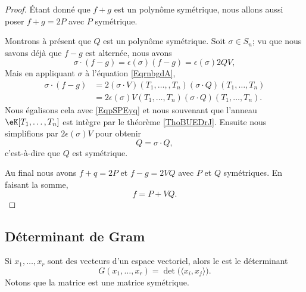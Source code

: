 \begin{proof}
	Étant donné que \( f+g\) est un polynôme symétrique, nous allons aussi poser \( f+g=2P\) avec \( P\) symétrique.

	Montrons à présent que \( Q\) est un polynôme symétrique. Soit \( \sigma\in S_n\); vu que nous savons déjà que \( f-g\) est alternée, nous avons
	\begin{equation}    \label{EqpSPEyq}
		\sigma\cdot (f-g)=\epsilon(\sigma)(f-g)=\epsilon(\sigma)2QV,
	\end{equation}
	Mais en appliquant \( \sigma\) à l'équation \eqref{EqrnbgdA},
	\begin{subequations}
		\begin{align}
			\sigma\cdot (f-g) & =2(\sigma\cdot V)(T_1,\ldots, ,T_n)(\sigma\cdot Q)(T_1,\ldots,T_n)    \\
			                  & =2\epsilon(\sigma)V(T_1,\ldots, T_n)(\sigma\cdot Q)(T_1,\ldots, T_n).
		\end{align}
	\end{subequations}
	Nous égalisons cela avec \eqref{EqpSPEyq} et nous souvenant que l'anneau \( \eK[T_1,\ldots, T_n]\) est intègre par le théorème \ref{ThoBUEDrJ}. Ensuite nous simplifions par \( 2\epsilon(\sigma)V\) pour obtenir
	\begin{equation}
		Q=\sigma\cdot Q,
	\end{equation}
	c'est-à-dire que \( Q\) est symétrique.

	Au final nous avons \( f+q=2P\) et \( f-g=2VQ\) avec \( P\) et \( Q\) symétriques. En faisant la somme,
	\begin{equation}
		f=P+VQ.
	\end{equation}
\end{proof}

\subsection{Déterminant de Gram}

Si \( x_1,\ldots, x_r\) sont des vecteurs d'un espace vectoriel, alors le  est le déterminant
\begin{equation}
	G(x_1,\ldots, x_r)=\det\big( \langle x_i, x_j\rangle  \big).
\end{equation}
Notons que la matrice est une matrice symétrique.

